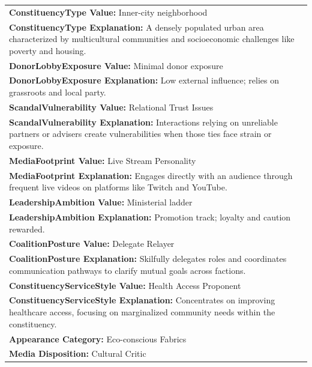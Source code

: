 \documentclass[11pt]{article}
\begin{document}
\begin{table}[ht]
\begin{tabularx}{\textwidth}{X}
\textbf{ConstituencyType Value:} Inner-city neighborhood \\
\textbf{ConstituencyType Explanation:} A densely populated urban area characterized by multicultural communities and socioeconomic challenges like poverty and housing. \\[4pt]

\textbf{DonorLobbyExposure Value:} Minimal donor exposure \\
\textbf{DonorLobbyExposure Explanation:} Low external influence; relies on grassroots and local party. \\[4pt]

\textbf{ScandalVulnerability Value:} Relational Trust Issues \\
\textbf{ScandalVulnerability Explanation:} Interactions relying on unreliable partners or advisers create vulnerabilities when those ties face strain or exposure. \\[4pt]

\textbf{MediaFootprint Value:} Live Stream Personality \\
\textbf{MediaFootprint Explanation:} Engages directly with an audience through frequent live videos on platforms like Twitch and YouTube. \\[4pt]

\textbf{LeadershipAmbition Value:} Ministerial ladder \\
\textbf{LeadershipAmbition Explanation:} Promotion track; loyalty and caution rewarded. \\[4pt]

\textbf{CoalitionPosture Value:} Delegate Relayer \\
\textbf{CoalitionPosture Explanation:} Skilfully delegates roles and coordinates communication pathways to clarify mutual goals across factions. \\[4pt]

\textbf{ConstituencyServiceStyle Value:} Health Access Proponent \\
\textbf{ConstituencyServiceStyle Explanation:} Concentrates on improving healthcare access, focusing on marginalized community needs within the constituency. \\[4pt]

\textbf{Appearance Category:} Eco-conscious Fabrics \\
\textbf{Media Disposition:} Cultural Critic \\[4pt]


\end{tabularx}
\end{table}
\end{document}
